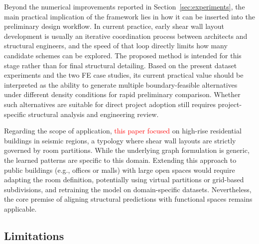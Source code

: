 Beyond the numerical improvements reported in Section~\ref{sec:experiments}, the main practical implication of the framework lies in how it can be inserted into the preliminary design workflow. In current practice, early shear wall layout development is usually an iterative coordination process between architects and structural engineers, and the speed of that loop directly limits how many candidate schemes can be explored. The proposed method is intended for this stage rather than for final structural detailing. Based on the present dataset experiments and the two FE case studies, its current practical value should be interpreted as the ability to generate multiple boundary-feasible alternatives under different density conditions for rapid preliminary comparison. Whether such alternatives are suitable for direct project adoption still requires project-specific structural analysis and engineering review.

Regarding the scope of application, \textcolor{red}{this paper focused} on high-rise residential buildings in seismic regions, a typology where shear wall layouts are strictly governed by room partitions. While the underlying graph formulation is generic, the learned patterns are specific to this domain. Extending this approach to public buildings (e.g., offices or malls) with large open spaces would require adapting the room definition, potentially using virtual partitions or grid-based subdivisions, and retraining the model on domain-specific datasets. Nevertheless, the core premise of aligning structural predictions with functional spaces remains applicable.

\subsection{Limitations}
\label{subsec:limitations}

